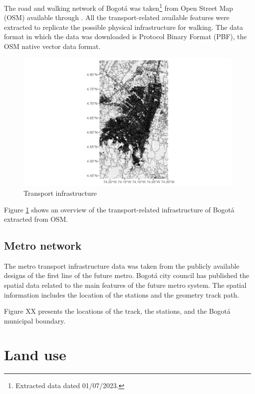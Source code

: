 \documentclass[12pt, a4paper]{report}
\begin{document}
The road and walking network of Bogotá was taken\footnote{Extracted data dated 01/07/2023.} from Open Street Map (OSM) available through \cite{hotexporttoolHOTExportTool2023}. All the transport-related available features were extracted to replicate the possible physical infrastructure for walking. The data format in which the data was downloaded is Protocol Binary Format (PBF), the OSM native vector data format.

\begin{figure}[H]
    \centering
    \includegraphics[width=15cm]{Data/Results/Images/OSM_Network.png}
    \caption{Transport infrastructure \citep{openstreetmapcontributorsPlanetDumpRetrieved2023}}
    \label{fig:OSM_Network}
\end{figure}

Figure \ref{fig:OSM_Network} shows an overview of the transport-related infrastructure of Bogotá extracted from OSM. 


\subsection{Metro network}

The metro transport infrastructure data was taken from the publicly available designs of the first line of the future metro. Bogotá city council has published the spatial data related to the main features of the future metro system. The spatial information includes the location of the stations and the geometry track path.

Figure XX presents the locations of the track, the stations, and the Bogotá municipal boundary. 

\section{Land use}
\end{document}
